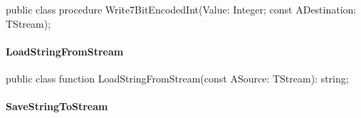 \documentclass{report}
\newif\ifpdf
\begin{document}
\label{PasDoc_Serialize.TSerializable-Write7BitEncodedInt}
\begin{list}{}{
\setlength{\itemindent}{0cm}
\setlength{\listparindent}{0cm}
\setlength{\leftmargin}{\evensidemargin}
\addtolength{\leftmargin}{\tmplength}
\settowidth{\labelsep}{X}
\addtolength{\leftmargin}{\labelsep}
\setlength{\labelwidth}{\tmplength}
}
\item[\textbf{Declaration}\hfill]
\ifpdf
\begin{flushleft}
\fi
\begin{ttfamily}
public class procedure Write7BitEncodedInt(Value: Integer; const ADestination: TStream);\end{ttfamily}

\ifpdf
\end{flushleft}
\fi

\end{list}
\paragraph*{LoadStringFromStream}\hspace*{\fill}

\label{PasDoc_Serialize.TSerializable-LoadStringFromStream}
\begin{list}{}{
\setlength{\itemindent}{0cm}
\setlength{\listparindent}{0cm}
\setlength{\leftmargin}{\evensidemargin}
\addtolength{\leftmargin}{\tmplength}
\settowidth{\labelsep}{X}
\addtolength{\leftmargin}{\labelsep}
\setlength{\labelwidth}{\tmplength}
}
\item[\textbf{Declaration}\hfill]
\ifpdf
\begin{flushleft}
\fi
\begin{ttfamily}
public class function LoadStringFromStream(const ASource: TStream): string;\end{ttfamily}

\ifpdf
\end{flushleft}
\fi

\end{list}
\paragraph*{SaveStringToStream}\hspace*{\fill}
\end{document}
